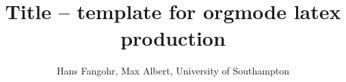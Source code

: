 \documentclass{article}
\begin{document}
\title{\sffamily \textbf{Title -- template for orgmode latex production}}

\author{Hans Fangohr, Max Albert, University of Southampton}

\maketitle






\end{document}
